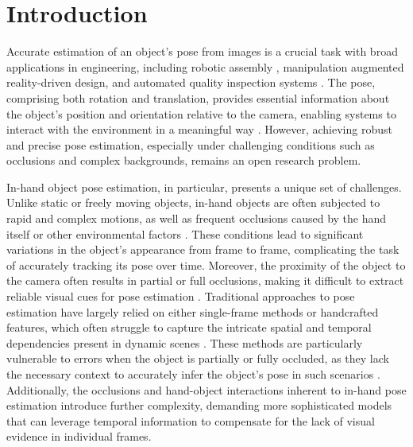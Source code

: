 \section{Introduction}
\label{sec:intro}

Accurate estimation of an object's pose from images is a crucial task with broad applications in engineering, including robotic assembly , manipulation augmented reality-driven design, and automated quality inspection systems \cite{trabelsi2021pose, hoang2024object, wang2021gdr}. The pose, comprising both rotation and translation, provides essential information about the object's position and orientation relative to the camera, enabling systems to interact with the environment in a meaningful way \cite{hoang2024graspability, peng2019pvnet, wang2021gdr}. However, achieving robust and precise pose estimation, especially under challenging conditions such as occlusions and complex backgrounds, remains an open research problem. 

In-hand object pose estimation, in particular, presents a unique set of challenges. Unlike static or freely moving objects, in-hand objects are often subjected to rapid and complex motions, as well as frequent occlusions caused by the hand itself or other environmental factors \cite{chao2021dexycb, hoang2024multi, garcia2018first, llop2022benchmarking}. These conditions lead to significant variations in the object's appearance from frame to frame, complicating the task of accurately tracking its pose over time. Moreover, the proximity of the object to the camera often results in partial or full occlusions, making it difficult to extract reliable visual cues for pose estimation \cite{wang20216d, li2019cdpn, hoang2020panoptic}. Traditional approaches to pose estimation have largely relied on either single-frame methods or handcrafted features, which often struggle to capture the intricate spatial and temporal dependencies present in dynamic scenes \cite{billings2019silhonet, peng2019pvnet}. These methods are particularly vulnerable to errors when the object is partially or fully occluded, as they lack the necessary context to accurately infer the object's pose in such scenarios \cite{trabelsi2021pose, rad2017bb8, hoang2020object}. Additionally, the occlusions and hand-object interactions inherent to in-hand pose estimation introduce further complexity, demanding more sophisticated models that can leverage temporal information to compensate for the lack of visual evidence in individual frames.

